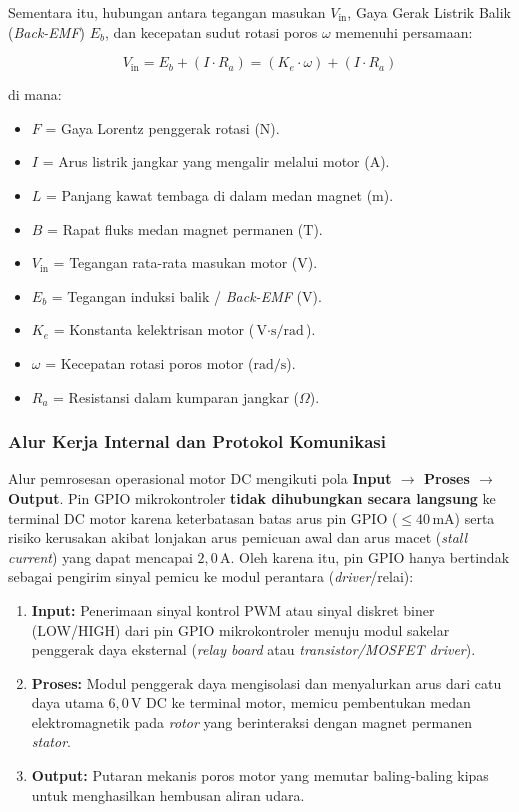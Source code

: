 Sementara itu, hubungan antara tegangan masukan $V_{\text{in}}$, Gaya Gerak Listrik Balik (\textit{Back-EMF}) $E_b$, dan kecepatan sudut rotasi poros $\omega$ memenuhi persamaan:

\begin{equation}
	V_{\text{in}} = E_b + (I \cdot R_a) = (K_e \cdot \omega) + (I \cdot R_a)
	\label{eq:dc_motor_voltage}
\end{equation}

\noindent di mana:
\begin{itemize}
	\item $F$ = Gaya Lorentz penggerak rotasi ($\text{N}$).
	\item $I$ = Arus listrik jangkar yang mengalir melalui motor ($\text{A}$).
	\item $L$ = Panjang kawat tembaga di dalam medan magnet ($\text{m}$).
	\item $B$ = Rapat fluks medan magnet permanen ($\text{T}$).
	\item $V_{\text{in}}$ = Tegangan rata-rata masukan motor ($\text{V}$).
	\item $E_b$ = Tegangan induksi balik / \textit{Back-EMF} ($\text{V}$).
	\item $K_e$ = Konstanta kelektrisan motor ($\text{V}\cdot\text{s/rad}$).
	\item $\omega$ = Kecepatan rotasi poros motor ($\text{rad/s}$).
	\item $R_a$ = Resistansi dalam kumparan jangkar ($\Omega$).
\end{itemize}

\subsubsection{Alur Kerja Internal dan Protokol Komunikasi}
Alur pemrosesan operasional motor DC mengikuti pola \textbf{Input $\rightarrow$ Proses $\rightarrow$ Output}. Pin GPIO mikrokontroler \textbf{tidak dihubungkan secara langsung} ke terminal DC motor karena keterbatasan batas arus pin GPIO ($\le 40\,\text{mA}$) serta risiko kerusakan akibat lonjakan arus pemicuan awal dan arus macet (\textit{stall current}) yang dapat mencapai $2{,}0\,\text{A}$. Oleh karena itu, pin GPIO hanya bertindak sebagai pengirim sinyal pemicu ke modul perantara (\textit{driver}/relai):

\begin{enumerate}
	\item \textbf{Input:} Penerimaan sinyal kontrol PWM atau sinyal diskret biner (LOW/HIGH) dari pin GPIO mikrokontroler menuju modul sakelar penggerak daya eksternal (\textit{relay board} atau \textit{transistor/MOSFET driver}).
	\item \textbf{Proses:} Modul penggerak daya mengisolasi dan menyalurkan arus dari catu daya utama $6{,}0\,\text{V DC}$ ke terminal motor, memicu pembentukan medan elektromagnetik pada \textit{rotor} yang berinteraksi dengan magnet permanen \textit{stator}.
	\item \textbf{Output:} Putaran mekanis poros motor yang memutar baling-baling kipas untuk menghasilkan hembusan aliran udara.
\end{enumerate}

